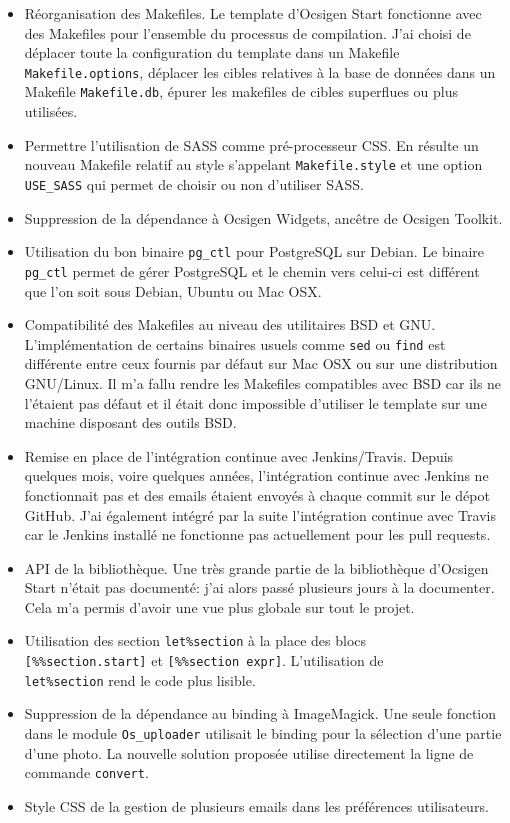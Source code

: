 \begin{itemize}
\item Réorganisation des Makefiles. Le template d'Ocsigen Start fonctionne avec
  des Makefiles pour l'ensemble du processus de compilation. J'ai choisi de
  déplacer toute la configuration du template dans un Makefile
  \verb|Makefile.options|, déplacer les cibles relatives à la base de données
  dans un Makefile \verb|Makefile.db|, épurer les makefiles de cibles superflues
  ou plus utilisées.

  \item Permettre l'utilisation de SASS comme pré-processeur CSS. En résulte un
    nouveau Makefile relatif au style s'appelant \verb|Makefile.style| et une
    option \verb|USE_SASS| qui permet de choisir ou non d'utiliser SASS.
  \item Suppression de la dépendance à Ocsigen Widgets, ancêtre de Ocsigen Toolkit.
  \item Utilisation du bon binaire \verb|pg_ctl| pour PostgreSQL sur Debian. Le
    binaire \verb|pg_ctl| permet de gérer PostgreSQL et le chemin vers celui-ci
    est différent que l'on soit sous Debian, Ubuntu ou Mac OSX.
  \item Compatibilité des Makefiles au niveau des utilitaires BSD et GNU.
    L'implémentation de certains binaires usuels comme \verb|sed| ou \verb|find|
    est différente entre ceux fournis par défaut sur Mac OSX ou sur une
    distribution GNU/Linux. Il m'a fallu rendre les Makefiles compatibles avec
    BSD car ils ne l'étaient pas défaut et il était donc impossible d'utiliser
    le template sur une machine disposant des outils BSD.
  \item Remise en place de l'intégration continue avec Jenkins/Travis. Depuis quelques
    mois, voire quelques années, l'intégration continue avec Jenkins ne
    fonctionnait pas et des emails étaient envoyés à chaque commit sur le dépot
    GitHub. J'ai également intégré par la suite l'intégration continue avec
    Travis car le Jenkins installé ne fonctionne pas actuellement pour les pull
   requests.
  \item API de la bibliothèque. Une très grande partie de la bibliothèque
    d'Ocsigen Start n'était pas documenté: j'ai alors passé plusieurs jours à la
    documenter. Cela m'a permis d'avoir une vue plus globale sur tout le projet.
  \item Utilisation des section \verb|let%section| à la place des blocs \\
    \verb|[%%section.start]| et \verb|[%%section expr]|. L'utilisation de \\
    \verb|let%section| rend le code plus lisible.
  \item Suppression de la dépendance au binding à ImageMagick. Une seule
    fonction dans le module \verb|Os_uploader| utilisait le binding pour la
    sélection d'une partie d'une photo. La nouvelle solution proposée utilise
    directement la ligne de commande \verb|convert|.
  \item Style CSS de la gestion de plusieurs emails dans les préférences
    utilisateurs.
\end{itemize}

